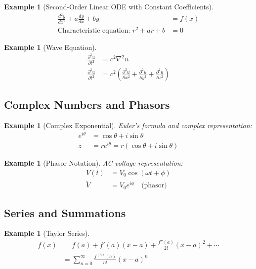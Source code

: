 \documentclass{article}
\newtheorem{example}[theorem]{Example}
\begin{document}
\begin{example}[Second-Order Linear ODE with Constant Coefficients]
\begin{align*}
    \frac{d^2y}{dx^2} + a\frac{dy}{dx} + by &= f(x) \\
    \text{Characteristic equation: } r^2 + ar + b &= 0
\end{align*}
\end{example}

\begin{example}[Wave Equation]
\begin{align*}
    \frac{\partial^2 u}{\partial t^2} &= c^2\nabla^2 u \\
    \frac{\partial^2 u}{\partial t^2} &= c^2\left(\frac{\partial^2 u}{\partial x^2} + \frac{\partial^2 u}{\partial y^2} + \frac{\partial^2 u}{\partial z^2}\right)
\end{align*}
\end{example}

\subsection{Complex Numbers and Phasors}

\begin{example}[Complex Exponential]
Euler's formula and complex representation:
\begin{align*}
    e^{i\theta} &= \cos\theta + i\sin\theta \\
    z &= re^{i\theta} = r(\cos\theta + i\sin\theta)
\end{align*}
\end{example}

\begin{example}[Phasor Notation]
AC voltage representation:
\begin{align*}
    V(t) &= V_0\cos(\omega t + \phi) \\
    \tilde{V} &= V_0e^{i\phi} \quad \text{(phasor)}
\end{align*}
\end{example}

\subsection{Series and Summations}

\begin{example}[Taylor Series]
\begin{align*}
    f(x) &= f(a) + f'(a)(x-a) + \frac{f''(a)}{2!}(x-a)^2 + \cdots \\
    &= \sum_{n=0}^{\infty} \frac{f^{(n)}(a)}{n!}(x-a)^n
\end{align*}
\end{example}
\end{document}
